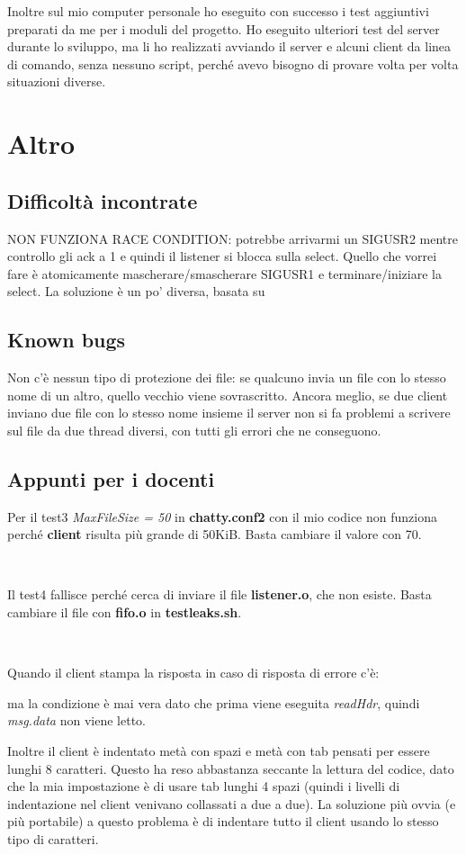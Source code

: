 \documentclass[a4paper]{article}
\theoremstyle{theorem}
\theoremstyle{remark}
\theoremstyle{definition}
\theoremstyle{corollary}
\theoremstyle{lemma}
\newcommand\file[1]{%
	\textbf{#1}}
\newcommand\codeName[1]{%
	\textit{#1}}
\begin{document}
Inoltre sul mio computer personale ho eseguito con successo i test aggiuntivi preparati da me per i moduli del progetto. Ho eseguito ulteriori test del server durante lo sviluppo, ma li ho realizzati avviando il server e alcuni client da linea di comando, senza nessuno script, perché avevo bisogno di provare volta per volta situazioni diverse.

\section{Altro}
\subsection{Difficoltà incontrate}\label{difficolta}
NON FUNZIONA RACE CONDITION: potrebbe arrivarmi un SIGUSR2 mentre controllo gli ack a 1 e quindi il listener si blocca sulla select. Quello che vorrei fare è atomicamente mascherare/smascherare SIGUSR1 e terminare/iniziare la select. La soluzione è un po' diversa, basata su 

\subsection{Known bugs}
Non c'è nessun tipo di protezione dei file: se qualcuno invia un file con lo stesso nome di un altro, quello vecchio viene sovrascritto. Ancora meglio, se due client inviano due file con lo stesso nome insieme il server non si fa problemi a scrivere sul file da due thread diversi, con tutti gli errori che ne conseguono.

\subsection{Appunti per i docenti}
Per il test3 \textit{MaxFileSize = 50} in \file{chatty.conf2} con il mio codice non funziona perché \file{client} risulta più grande di 50KiB. Basta cambiare il valore con 70.
\

\

Il test4 fallisce perché cerca di inviare il file \file{listener.o}, che non esiste. Basta cambiare il file con \file{fifo.o} in \file{testleaks.sh}.
\

\

Quando il client stampa la risposta in caso di risposta di errore c'è:

ma la condizione è mai vera dato che prima viene eseguita \codeName{readHdr}, quindi \codeName{msg.data} non viene letto.

Inoltre il client è indentato metà con spazi e metà con tab pensati per essere lunghi 8 caratteri. Questo ha reso abbastanza seccante la lettura del codice, dato che la mia impostazione è di usare tab lunghi 4 spazi (quindi i livelli di indentazione nel client venivano collassati a due a due). La soluzione più ovvia (e più portabile) a questo problema è di indentare tutto il client usando lo stesso tipo di caratteri.
\end{document}
